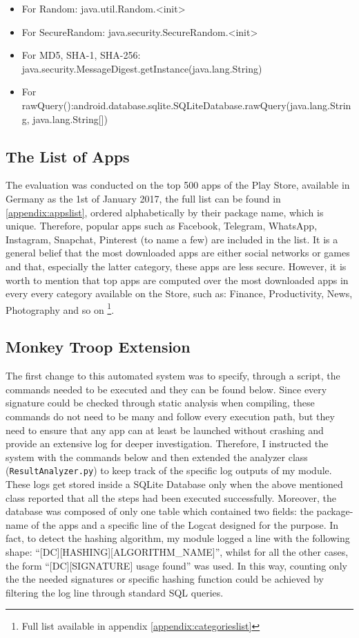 \begin{itemize}
	\label{it:signs}
	\item{For Random: java.util.Random.\textless init\textgreater}
	\item{For SecureRandom: java.security.SecureRandom.\textless init\textgreater}
	\item{For MD5, SHA-1, SHA-256: java.security.MessageDigest.getInstance(java.lang.String)}
	\item{For rawQuery():\newline android.database.sqlite.SQLiteDatabase.rawQuery(java.lang.String, java.lang.String[])}
\end{itemize}

\subsection{The List of Apps}
The evaluation was conducted on the top 500 apps of the Play Store, available in Germany as the 1st of January 2017, the full list can be found in \ref{appendix:appslist}, ordered alphabetically by their package name, which is unique. Therefore, popular apps such as Facebook, Telegram, WhatsApp, Instagram, Snapchat, Pinterest (to name a few) are included in the list. It is a general belief that the most downloaded apps are either social networks or games and that, especially the latter category, these apps are less secure. However, it is worth to mention that top apps are computed over the most downloaded apps in every every category available on the Store, such as: Finance, Productivity, News, Photography and so on \footnote{Full list available in appendix \ref{appendix:categorieslist}}.

\newpage
\subsection{Monkey Troop Extension}
The first change to this automated system was to specify, through a script, the commands needed to be executed and they can be found below. Since every signature could be checked through static analysis when compiling, these commands do not need to be many and follow every execution path, but they need to ensure that any app can at least be launched without crashing and provide an extensive log for deeper investigation. Therefore, I instructed the system with the commands below and then extended the analyzer class (\texttt{ResultAnalyzer.py}) to keep track of the specific log outputs of my module. These logs get stored inside a SQLite Database only when the above mentioned class reported that all the steps had been executed successfully. Moreover, the database was composed of only one table which contained two fields: the package-name of the apps and a specific line of the Logcat designed for the purpose. In fact, to detect the hashing algorithm, my module logged a line with the following shape: \enquote{[DC][HASHING][ALGORITHM\_NAME]}, whilst for all the other cases, the form \enquote{[DC][SIGNATURE] usage found} was used. In this way, counting only the the needed signatures or specific hashing function could be achieved by filtering the log line through standard SQL queries.

